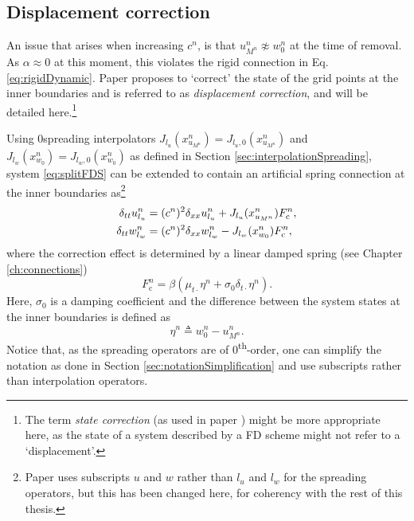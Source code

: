 \subsection{Displacement correction}
An issue that arises when increasing $c^n$, is that $u_{M^n}^n \not\approx w_0^n$ at the time of removal. As $\alpha \approx 0$ at this moment, this violates the rigid connection in Eq. \eqref{eq:rigidDynamic}.
Paper \citeP[G] proposes to `correct' the state of the grid points at the inner boundaries and is referred to as \textit{displacement correction}, and will be detailed here.\footnote{The term \textit{state correction} (as used in paper \citeP[H]) might be more appropriate here, as the state of a system described by a FD scheme might not refer to a `displacement'.} 

Using 0\thOrder spreading interpolators  $J_{l_u}(x_{u_{M^n}}^n) = J_{l_u, 0}(x_{u_{M^n}}^n)$ and \linebreak$J_{l_w}(x_{w_0}^n) = J_{l_w,0}(x_{w_0}^n)$ as defined in Section \ref{sec:interpolationSpreading}, system \eqref{eq:splitFDS} can be extended to contain an artificial spring connection at the inner boundaries as\footnote{Paper \citeP[G] uses subscripts $u$ and $w$ rather than $l_u$ and $l_w$ for the spreading operators, but this has been changed here, for coherency with the rest of this thesis.}
\begin{subequations}\label{eq:sysDispCorr}
\begin{align}
    \delta_{tt}\ulun &= (c^n)^2\delta_{xx}\ulun+ J_{l_u}(x_{u_{M^n}}^n)%
    F_\text{c}^n,\\
    \delta_{tt}\wlwn &= (c^n)^2\delta_{xx}\wlwn - J_{l_w}(x_{w_0}^n)%
    F_\text{c}^n,
\end{align}
\end{subequations}
where the correction effect %
is determined by a linear damped spring (see Chapter \ref{ch:connections})
\begin{equation}\label{eq:dispCorrForce}
    F_\text{c}^n = \beta \left(\mu_{t\cdot}\eta^n +\sigma_0\delta_{t\cdot}\eta^n \right).
\end{equation}
Here, $\sigma_0$ is a damping coefficient and the difference between the system states at the inner boundaries is defined as
\begin{equation}\label{eq:etaDispCorr}
    \eta^n \triangleq w_0^n - u_{M^n}^n.
\end{equation}
Notice that, as the spreading operators are of 0\textsuperscript{th}-order, one can simplify the notation as done in Section \ref{sec:notationSimplification} and use subscripts rather than interpolation operators.

